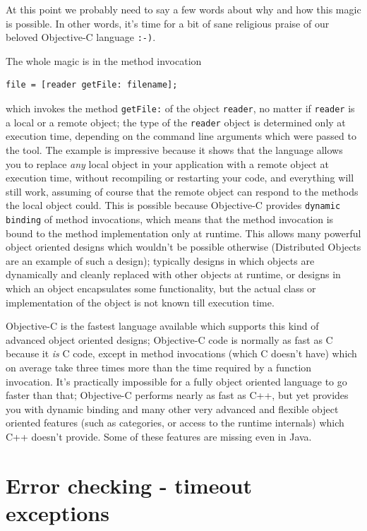 \documentclass[a4paper]{article}
\begin{document}
At this point we probably need to say a few words about why and how
this magic is possible.  In other words, it's time for a bit of sane
religious praise of our beloved Objective-C language {\tt :-)}.

The whole magic is in the method invocation
\begin{verbatim}
file = [reader getFile: filename];
\end{verbatim}
which invokes the method \texttt{getFile:} of the object
\texttt{reader}, no matter if \texttt{reader} is a local or a remote
object; the type of the \texttt{reader} object is determined only at
execution time, depending on the command line arguments which were
passed to the tool.  The example is impressive because it shows that
the language allows you to replace {\it any} local object in your
application with a remote object at execution time, without
recompiling or restarting your code, and everything will still work,
assuming of course that the remote object can respond to the methods
the local object could.  This is possible because Objective-C provides
\texttt{dynamic binding} of method invocations, which means that the
method invocation is bound to the method implementation only at
runtime.  This allows many powerful object oriented designs which
wouldn't be possible otherwise (Distributed Objects are an example of
such a design); typically designs in which objects are dynamically and
cleanly replaced with other objects at runtime, or designs in which an
object encapsulates some functionality, but the actual class or
implementation of the object is not known till execution time.

Objective-C is the fastest language available which supports this kind
of advanced object oriented designs; Objective-C code is normally as
fast as C because it {\it is} C code, except in method invocations
(which C doesn't have) which on average take three times more than the
time required by a function invocation.  It's practically impossible
for a fully object oriented language to go faster than that;
Objective-C performs nearly as fast as C++, but yet provides you with
dynamic binding and many other very advanced and flexible object
oriented features (such as categories, or access to the runtime
internals) which C++ doesn't provide.  Some of these features are
missing even in Java.


\section{Error checking - timeout exceptions}
\end{document}
